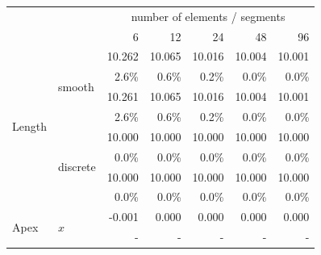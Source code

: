 \begin{figure}[p]
\begin{fullpage}
\centering
{}
\begin{tabularx}{0.75\textwidth}{@{} XX rrrrr@{}}
\toprule
& & \multicolumn{5}{c}{number of elements / segments} \\\cmidrule{3-7}
&  &  6 & 12 & 24 & 48 & 96 \\
\midrule
\multirow{8}{*}{Length}&\multirow{4}{*}{smooth}&{\color{Tblue}\normalsize10.262}&{\color{Tblue}\normalsize10.065}&{\color{Tblue}\normalsize10.016}&{\color{Tblue}\normalsize10.004}&{\color{Tblue}\normalsize10.001}\\
&&{\color{Tblue}\scriptsize2.6\%}&{\color{Tblue}\scriptsize0.6\%}&{\color{Tblue}\scriptsize0.2\%}&{\color{Tblue}\scriptsize0.0\%}&{\color{Tblue}\scriptsize0.0\%}\\
&&{\color{black}\normalsize10.261}&{\color{black}\normalsize10.065}&{\color{black}\normalsize10.016}&{\color{black}\normalsize10.004}&{\color{black}\normalsize10.001}\\
&&{\color{black}\scriptsize2.6\%}&{\color{black}\scriptsize0.6\%}&{\color{black}\scriptsize0.2\%}&{\color{black}\scriptsize0.0\%}&{\color{black}\scriptsize0.0\%}\\\cmidrule[0.5\cmidrulewidth]{2-7}
&\multirow{4}{*}{discrete}&{\color{Tblue}\normalsize10.000}&{\color{Tblue}\normalsize10.000}&{\color{Tblue}\normalsize10.000}&{\color{Tblue}\normalsize10.000}&{\color{Tblue}\normalsize10.000}\\
&&{\color{Tblue}\scriptsize0.0\%}&{\color{Tblue}\scriptsize0.0\%}&{\color{Tblue}\scriptsize0.0\%}&{\color{Tblue}\scriptsize0.0\%}&{\color{Tblue}\scriptsize0.0\%}\\
&&{\color{black}\normalsize10.000}&{\color{black}\normalsize10.000}&{\color{black}\normalsize10.000}&{\color{black}\normalsize10.000}&{\color{black}\normalsize10.000}\\
&&{\color{black}\scriptsize0.0\%}&{\color{black}\scriptsize0.0\%}&{\color{black}\scriptsize0.0\%}&{\color{black}\scriptsize0.0\%}&{\color{black}\scriptsize0.0\%}\\\midrule
\multirow{12}{*}{Apex}  &\multirow{4}{*}{$x$}&{\color{Tblue}\normalsize-0.001}&{\color{Tblue}\normalsize0.000}&{\color{Tblue}\normalsize0.000}&{\color{Tblue}\normalsize0.000}&{\color{Tblue}\normalsize0.000}\\
&&{\color{Tblue}\scriptsize-}&{\color{Tblue}\scriptsize-}&{\color{Tblue}\scriptsize-}&{\color{Tblue}\scriptsize-}&{\color{Tblue}\scriptsize-}\\

\end{tabularx}
\end{fullpage}
\end{figure}
